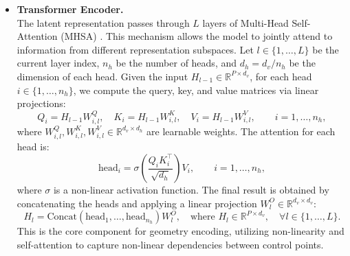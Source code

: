 \documentclass{article}
\newcommand{\Dlat}{d_v} %
\theoremstyle{plain}
\numberwithin{equation}{section}
\begin{document}
\begin{itemize}
    \item \textbf{Transformer Encoder.}\\
          The latent representation passes through $L$ layers of Multi-Head Self-Attention (MHSA) \cite{vaswani2017attention}. This mechanism allows the model to jointly attend to information from different representation subspaces.
          Let $l \in \{1, \ldots, L\}$ be the current layer index, $n_h$ be the number of heads, and $d_h = \Dlat/n_h$ be the dimension of each head. Given the input $H_{l-1} \in \mathbb{R}^{P \times \Dlat}$, for each head $i \in \{1, \ldots, n_h\}$, we compute the query, key, and value matrices via linear projections:
          \begin{equation*}
              Q_i = H_{l-1} W_{i,l}^Q, \quad K_i = H_{l-1} W_{i,l}^K, \quad V_i = H_{l-1} W_{i,l}^V, \qquad i=1,\ldots,n_h,
          \end{equation*}
          where $W_{i,l}^Q, W_{i,l}^K, W_{i,l}^V \in \mathbb{R}^{\Dlat \times d_h}$ are learnable weights. The attention for each head is:
          \begin{equation*}
              \text{head}_i = \sigma\left(\frac{Q_i K_i^\top}{\sqrt{d_h}}\right) V_i, \qquad i=1, \ldots, n_h,
          \end{equation*}
          where $\sigma$ is a non-linear activation function. The final result is obtained by concatenating the heads and applying a linear projection $W_l^O \in \mathbb{R}^{\Dlat \times \Dlat}$:
          \begin{equation*}
              H_l = \text{Concat}(\text{head}_1, \ldots, \text{head}_{n_h}) W_l^O, \quad \text{where } H_l \in \mathbb{R}^{P \times \Dlat}, \quad \forall l \in \{1, \ldots, L\}.
          \end{equation*}
          This is the core component for geometry encoding, utilizing non-linearity and self-attention to capture non-linear dependencies between control points.


\end{itemize}
\end{document}
